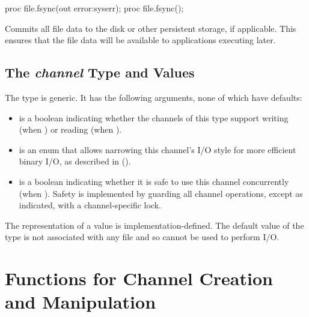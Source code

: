 \begin{protohead}
proc file.fsync(out error:syserr);
proc file.fsync();
\end{protohead}
\begin{protobody}
Commits all file data to the disk or other persistent storage, if
applicable. This ensures that the file data will be available to
applications executing later.
\end{protobody}


\subsection{The {\em channel} Type and Values}
\label{IO_channel_type}

The  type is generic. It has the following arguments,
none of which have defaults:

\begin{itemize}

\item {} is a boolean indicating whether the channels of this type
      support writing (when ) or reading (when ).

\item {} is an enum  that allows narrowing
      this channel's I/O style for more efficient binary I/O,
      as described in ().

\item {} is a boolean indicating whether it is
      safe to use this channel concurrently (when ).
      Safety is implemented by guarding all channel operations, except
      as indicated, with a channel-specific lock.

\end{itemize}

The representation of a  value is implementation-defined.
The default value of the  type is not associated
with any file and so cannot be used to perform I/O.


\section{Functions for Channel Creation and Manipulation}
\label{IO_channel_creation}


